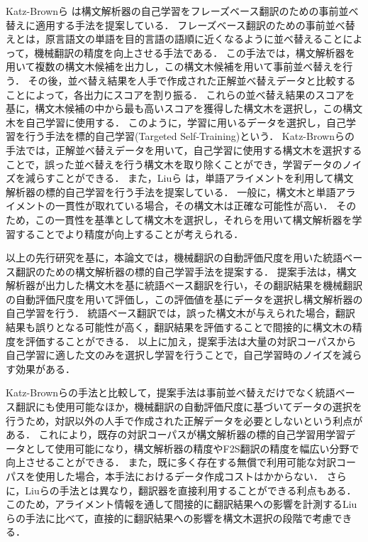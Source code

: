 \documentclass[japanese]{jnlp_1.4}
\begin{document}
Katz-Brownら \cite{katzbrown11targetedselftraining} は構文解析器の自己学習をフレーズベース翻訳のための事前並べ替えに適用する手法を提案している．
フレーズベース翻訳のための事前並べ替えとは，原言語文の単語を目的言語の語順に近くなるように並べ替えることによって，機械翻訳の精度を向上させる手法である．
この手法では，構文解析器を用いて複数の構文木候補を出力し，この構文木候補を用いて事前並べ替えを行う．
その後，並べ替え結果を人手で作成された正解並べ替えデータと比較することによって，各出力にスコアを割り振る．
これらの並べ替え結果のスコアを基に，構文木候補の中から最も高いスコアを獲得した構文木を選択し，この構文木を自己学習に使用する．
このように，学習に用いるデータを選択し，自己学習を行う手法を標的自己学習(Targeted Self-Training)という．
Katz-Brownらの手法では，正解並べ替えデータを用いて，自己学習に使用する構文木を選択することで，誤った並べ替えを行う構文木を取り除くことができ，学習データのノイズを減らすことができる．
また，Liuら \cite{liu12emnlp} は，単語アライメントを利用して構文解析器の標的自己学習を行う手法を提案している．
一般に，構文木と単語アライメントの一貫性が取れている場合，その構文木は正確な可能性が高い．
そのため，この一貫性を基準として構文木を選択し，それらを用いて構文解析器を学習することでより精度が向上することが考えられる．

以上の先行研究を基に，本論文では，機械翻訳の自動評価尺度を用いた統語ベース翻訳のための構文解析器の標的自己学習手法を提案する．
提案手法は，構文解析器が出力した構文木を基に統語ベース翻訳を行い，その翻訳結果を機械翻訳の自動評価尺度を用いて評価し，この評価値を基にデータを選択し構文解析器の自己学習を行う．
統語ベース翻訳では，誤った構文木が与えられた場合，翻訳結果も誤りとなる可能性が高く，翻訳結果を評価することで間接的に構文木の精度を評価することができる．
以上に加え，提案手法は大量の対訳コーパスから自己学習に適した文のみを選択し学習を行うことで，自己学習時のノイズを減らす効果がある．

Katz-Brownらの手法と比較して，提案手法は事前並べ替えだけでなく統語ベース翻訳にも使用可能なほか，機械翻訳の自動評価尺度に基づいてデータの選択を行うため，対訳以外の人手で作成された正解データを必要としないという利点がある．
これにより，既存の対訳コーパスが構文解析器の標的自己学習用学習データとして使用可能になり，構文解析器の精度やF2S翻訳の精度を幅広い分野で向上させることができる．
また，既に多く存在する無償で利用可能な対訳コーパスを使用した場合，本手法におけるデータ作成コストはかからない．
さらに，Liuらの手法とは異なり，翻訳器を直接利用することができる利点もある．
このため，アライメント情報を通して間接的に翻訳結果への影響を計測するLiuらの手法に比べて，直接的に翻訳結果への影響を構文木選択の段階で考慮できる．
\end{document}
